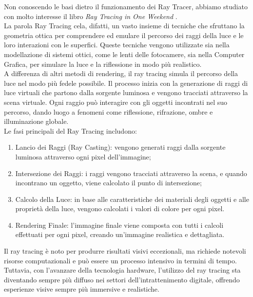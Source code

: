 \documentclass[main.tex]{subfiles}
\begin{document}
\hspace*{0.25in}Non conoscendo le basi dietro il funzionamento dei Ray Tracer, abbiamo studiato con molto interesse il libro \textit{Ray Tracing in One Weekend} \cite{Shirley2023RTW1}. \\
La parola Ray Tracing cela, difatti, un vasto insieme di tecniche che sfruttano la geometria ottica per comprendere ed emulare il percorso dei raggi della luce e le loro interazioni con le superfici. Queste tecniche vengono utilizzate sia nella modellazione di sistemi ottici, come le lenti delle fotocamere, sia nella Computer Grafica, per simulare la luce e la riflessione in modo più realistico. \\
A differenza di altri metodi di rendering, il ray tracing simula il percorso della luce nel modo più fedele possibile. Il processo inizia con la generazione di raggi di luce virtuali che partono dalla sorgente luminosa e vengono tracciati attraverso la scena virtuale. Ogni raggio può interagire con gli oggetti incontrati nel suo percorso, dando luogo a fenomeni come riflessione, rifrazione, ombre e illuminazione globale.\\ 
Le fasi principali del Ray Tracing includono:
\begin{enumerate}
    \item Lancio dei Raggi (Ray Casting): vengono generati raggi dalla sorgente luminosa attraverso ogni pixel dell'immagine;
    
    \item Intersezione dei Raggi: i raggi vengono tracciati attraverso la scena, e quando incontrano un oggetto, viene calcolato il punto di intersezione;

    \item Calcolo della Luce: in base alle caratteristiche dei materiali degli oggetti e alle proprietà della luce, vengono calcolati i valori di colore per ogni pixel.

    \item Rendering Finale: l'immagine finale viene composta con tutti i calcoli effettuati per ogni pixel, creando un'immagine realistica e dettagliata.
\end{enumerate} 
Il ray tracing è noto per produrre risultati visivi eccezionali, ma richiede notevoli risorse computazionali e può essere un processo intensivo in termini di tempo. Tuttavia, con l'avanzare della tecnologia hardware, l'utilizzo del ray tracing sta diventando sempre più diffuso nei settori dell'intrattenimento digitale, offrendo esperienze visive sempre più immersive e realistiche.
\end{document}
